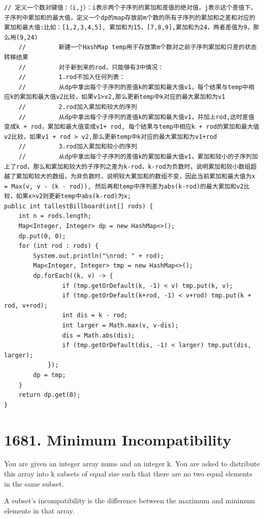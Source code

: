 \documentclass[9pt, b5paaper]{book}
\begin{document}
\begin{verbatim}
// 定义一个数对键值：（i,j）：i表示两个子序列的累加和差值的绝对值，j表示这个差值下，子序列中累加和的最大值，定义一个dp的map存放前m个数的所有子序列的累加和之差和对应的累加和最大值:比如：[1,2,3,4,5], 累加和为15，[7,8,9],累加和为24，两者差值为9，那么用(9,24)
    //         新建一个HashMap temp用于存放第m个数对之前子序列累加和只差的状态转移结果
    //         对于新到来的rod，只能够有3中情况：
    //         1.rod不加入任何列表：
    //         从dp中拿出每个子序列的差值k的累加和最大值v1，每个结果与temp中相应k的累加和最大值v2比较，如果v1>v2,那么更新temp中k对应的最大累加和为v1
    //         2.rod加入累加和较大的序列
    //         从dp中拿出每个子序列的差值k的累加和最大值v1，并加上rod,这时差值变成k + rod，累加和最大值变成v1+ rod, 每个结果与temp中相应k + rod的累加和最大值v2比较，如果v1 + rod > v2,那么更新temp中k对应的最大累加和为v1+rod
    //         3.rod加入累加和较小的序列
    //         从dp中拿出每个子序列的差值k的累加和最大值v1，累加和较小的子序列加上了rod，那么和累加和较大的子序列之差为k-rod，k-rod为负数时，说明累加和较小数组超越了累加和较大的数组，为非负数时，说明较大累加和的数组不变，因此当前累加和最大值为x = Max(v, v - (k - rod)), 然后再和temp中序列差为abs(k-rod)的最大累加和v2比较，如果x>v2则更新temp中abs(k-rod)为x;
public int tallestBillboard(int[] rods) {
    int n = rods.length;
    Map<Integer, Integer> dp = new HashMap<>();
    dp.put(0, 0);
    for (int rod : rods) {
        System.out.println("\nrod: " + rod);
        Map<Integer, Integer> tmp = new HashMap<>();
        dp.forEach((k, v) -> {
                if (tmp.getOrDefault(k, -1) < v) tmp.put(k, v);
                if (tmp.getOrDefault(k+rod, -1) < v+rod) tmp.put(k + rod, v+rod);
                int dis = k - rod;
                int larger = Math.max(v, v-dis);
                dis = Math.abs(dis);
                if (tmp.getOrDefault(dis, -1) < larger) tmp.put(dis, larger);
            });
        dp = tmp;
    }
    return dp.get(0);
}
\end{verbatim}

\section{1681. Minimum Incompatibility}
\label{sec-11-10}
You are given an integer array nums​​​ and an integer k. You are asked to distribute this array into k subsets of equal size such that there are no two equal elements in the same subset.

A subset's incompatibility is the difference between the maximum and minimum elements in that array.
\end{document}
